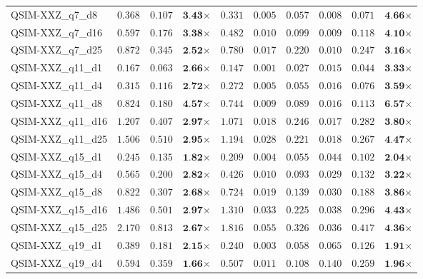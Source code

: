 \begin{table*}[t]
{\begin{tabular}{| l || r r c || r r r r r c |}
QSIM-XXZ\_q7\_d8 & $0.368$ & $0.107$ & $\textbf{3.43}$$\times$ & $0.331$ & $0.005$ & $0.057$ & $0.008$ & $0.071$ & $\textbf{4.66}$$\times$ \\
QSIM-XXZ\_q7\_d16 & $0.597$ & $0.176$ & $\textbf{3.38}$$\times$ & $0.482$ & $0.010$ & $0.099$ & $0.009$ & $0.118$ & $\textbf{4.10}$$\times$ \\
QSIM-XXZ\_q7\_d25 & $0.872$ & $0.345$ & $\textbf{2.52}$$\times$ & $0.780$ & $0.017$ & $0.220$ & $0.010$ & $0.247$ & $\textbf{3.16}$$\times$ \\
QSIM-XXZ\_q11\_d1 & $0.167$ & $0.063$ & $\textbf{2.66}$$\times$ & $0.147$ & $0.001$ & $0.027$ & $0.015$ & $0.044$ & $\textbf{3.33}$$\times$ \\
QSIM-XXZ\_q11\_d4 & $0.315$ & $0.116$ & $\textbf{2.72}$$\times$ & $0.272$ & $0.005$ & $0.055$ & $0.016$ & $0.076$ & $\textbf{3.59}$$\times$ \\
QSIM-XXZ\_q11\_d8 & $0.824$ & $0.180$ & $\textbf{4.57}$$\times$ & $0.744$ & $0.009$ & $0.089$ & $0.016$ & $0.113$ & $\textbf{6.57}$$\times$ \\
QSIM-XXZ\_q11\_d16 & $1.207$ & $0.407$ & $\textbf{2.97}$$\times$ & $1.071$ & $0.018$ & $0.246$ & $0.017$ & $0.282$ & $\textbf{3.80}$$\times$ \\
QSIM-XXZ\_q11\_d25 & $1.506$ & $0.510$ & $\textbf{2.95}$$\times$ & $1.194$ & $0.028$ & $0.221$ & $0.018$ & $0.267$ & $\textbf{4.47}$$\times$ \\
QSIM-XXZ\_q15\_d1 & $0.245$ & $0.135$ & $\textbf{1.82}$$\times$ & $0.209$ & $0.004$ & $0.055$ & $0.044$ & $0.102$ & $\textbf{2.04}$$\times$ \\
QSIM-XXZ\_q15\_d4 & $0.565$ & $0.200$ & $\textbf{2.82}$$\times$ & $0.426$ & $0.010$ & $0.093$ & $0.029$ & $0.132$ & $\textbf{3.22}$$\times$ \\
QSIM-XXZ\_q15\_d8 & $0.822$ & $0.307$ & $\textbf{2.68}$$\times$ & $0.724$ & $0.019$ & $0.139$ & $0.030$ & $0.188$ & $\textbf{3.86}$$\times$ \\
QSIM-XXZ\_q15\_d16 & $1.486$ & $0.501$ & $\textbf{2.97}$$\times$ & $1.310$ & $0.033$ & $0.225$ & $0.038$ & $0.296$ & $\textbf{4.43}$$\times$ \\
QSIM-XXZ\_q15\_d25 & $2.170$ & $0.813$ & $\textbf{2.67}$$\times$ & $1.816$ & $0.055$ & $0.326$ & $0.036$ & $0.417$ & $\textbf{4.36}$$\times$ \\
QSIM-XXZ\_q19\_d1 & $0.389$ & $0.181$ & $\textbf{2.15}$$\times$ & $0.240$ & $0.003$ & $0.058$ & $0.065$ & $0.126$ & $\textbf{1.91}$$\times$ \\
QSIM-XXZ\_q19\_d4 & $0.594$ & $0.359$ & $\textbf{1.66}$$\times$ & $0.507$ & $0.011$ & $0.108$ & $0.140$ & $0.259$ & $\textbf{1.96}$$\times$ \\

\end{tabular}}
\end{table*}
